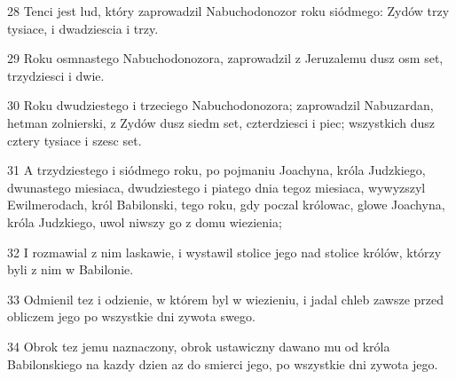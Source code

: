 \par 28 Tenci jest lud, który zaprowadzil Nabuchodonozor roku siódmego: Zydów trzy tysiace, i dwadziescia i trzy.
\par 29 Roku osmnastego Nabuchodonozora, zaprowadzil z Jeruzalemu dusz osm set, trzydziesci i dwie.
\par 30 Roku dwudziestego i trzeciego Nabuchodonozora; zaprowadzil Nabuzardan, hetman zolnierski, z Zydów dusz siedm set, czterdziesci i piec; wszystkich dusz cztery tysiace i szesc set.
\par 31 A trzydziestego i siódmego roku, po pojmaniu Joachyna, króla Judzkiego, dwunastego miesiaca, dwudziestego i piatego dnia tegoz miesiaca, wywyzszyl Ewilmerodach, król Babilonski, tego roku, gdy poczal królowac, glowe Joachyna, króla Judzkiego, uwol niwszy go z domu wiezienia;
\par 32 I rozmawial z nim laskawie, i wystawil stolice jego nad stolice królów, którzy byli z nim w Babilonie.
\par 33 Odmienil tez i odzienie, w którem byl w wiezieniu, i jadal chleb zawsze przed obliczem jego po wszystkie dni zywota swego.
\par 34 Obrok tez jemu naznaczony, obrok ustawiczny dawano mu od króla Babilonskiego na kazdy dzien az do smierci jego, po wszystkie dni zywota jego.


